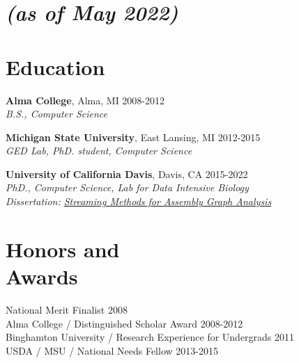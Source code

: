 \documentclass[margin,12pt]{camille_resume}
\begin{document}
\address{{\bf Permanent Address}\\
By Request\\
Davis, CA}
\address{
\hfill {\bf Contact}\\
\hfill camille.scott.w@gmail.com\\
\hfill cswel@ucdavis.edu}
\pagestyle{plain}

    
\begin{resume}



\section{\small \it{(as of May 2022)}}

    \section{\mysidestyle Education}

{\bf Alma College}, Alma, MI \hfill 2008-2012\\
{\em B.S., Computer Science}

\vspace{1mm}

{\bf Michigan State University}, East Lansing, MI \hfill 2012-2015\\
{\em GED Lab, PhD. student, Computer Science}

\vspace{1mm}

{\bf University of California Davis}, Davis, CA \hfill 2015-2022\\
{\em PhD., Computer Science, Lab for Data Intensive Biology}\\
{\em Dissertation: \href{https://github.com/camillescott/dissertation}{Streaming Methods for
    Assembly Graph Analysis}}

\vspace{2mm}

    \section{\mysidestyle Honors and\\Awards} 

National Merit Finalist \hfill 2008\\
Alma College / Distinguished Scholar Award \hfill 2008-2012\\
Binghamton University / Research Experience for Undergrads \hfill 2011\\
USDA / MSU /  National Needs Fellow \hfill 2013-2015\\


\end{resume}
\end{document}
